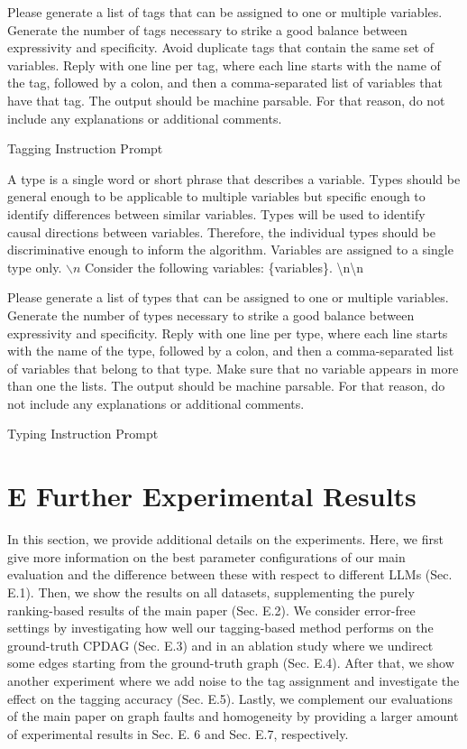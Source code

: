 \documentclass[10pt]{article}
\begin{document}
Please generate a list of tags that can be assigned to one or multiple variables. Generate the number of tags necessary to strike a good balance between expressivity and specificity. Avoid duplicate tags that contain the same set of variables. Reply with one line per tag, where each line starts with the name of the tag, followed by a colon, and then a comma-separated list of variables that have that tag. The output should be machine parsable. For that reason, do not include any explanations or additional comments.

Tagging Instruction Prompt

A type is a single word or short phrase that describes a variable. Types should be general enough to be applicable to multiple variables but specific enough to identify differences between similar variables. Types will be used to identify causal directions between variables. Therefore, the individual types should be discriminative enough to inform the algorithm. Variables are assigned to a single type only. $\backslash n$ Consider the following variables: \{variables\}. \textbackslash n\textbackslash n

Please generate a list of types that can be assigned to one or multiple variables. Generate the number of types necessary to strike a good balance between expressivity and specificity. Reply with one line per type, where each line starts with the name of the type, followed by a colon, and then a comma-separated list of variables that belong to that type. Make sure that no variable appears in more than one the lists. The output should be machine parsable. For that reason, do not include any explanations or additional comments.

Typing Instruction Prompt

\section*{E Further Experimental Results}
In this section, we provide additional details on the experiments. Here, we first give more information on the best parameter configurations of our main evaluation and the difference between these with respect to different LLMs (Sec. E.1). Then, we show the results on all datasets, supplementing the purely ranking-based results of the main paper (Sec. E.2). We consider error-free settings by investigating how well our tagging-based method performs on the ground-truth CPDAG (Sec. E.3) and in an ablation study where we undirect some edges starting from the ground-truth graph (Sec. E.4). After that, we show another experiment where we add noise to the tag assignment and investigate the effect on the tagging accuracy (Sec. E.5). Lastly, we complement our evaluations of the main paper on graph faults and homogeneity by providing a larger amount of experimental results in Sec. E. 6 and Sec. E.7, respectively.
\end{document}
